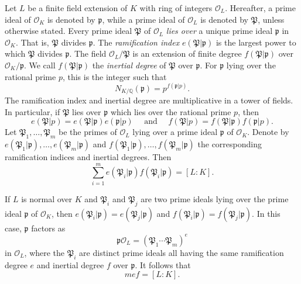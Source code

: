 Let $L$ be a finite field extension of $K$ with ring of integers $\mathcal{O}_L$. Hereafter, a prime ideal of $\mathcal{O}_K$ is denoted by $\mathfrak{p}$, while a prime ideal of $\mathcal{O}_L$ is denoted by $\mathfrak{P}$, unless otherwise stated. Every prime ideal $\mathfrak{P}$ of $\mathcal{O}_L$ \textit{lies over} a unique prime ideal $\mathfrak{p}$ in $\mathcal{O}_K$. That is, $\mathfrak{P}$ divides $\mathfrak{p}$. The \textit{ramification index} $e({\mathfrak{P}}|\mathfrak{p})$ is the largest power to which $\mathfrak{P}$ divides $\mathfrak{p}$. The field $\mathcal{O}_L/\mathfrak{P}$ is an extension of finite degree $f(\mathfrak{P}|\mathfrak{p})$ over $\mathcal{O}_K/\mathfrak{p}$. We call $f(\mathfrak{P}|\mathfrak{p})$ the \textit{inertial degree} of $\mathfrak{P}$ over $\mathfrak{p}$. For $\mathfrak{p}$ lying over the rational prime $p$, this is the integer such that 
\[N_{K/\mathbb{Q}}(\mathfrak{p}) = p^{f(\mathfrak{p}|p)}.\]
The ramification index and inertial degree are multiplicative in a tower of fields. In particular, if $\mathfrak{P}$ lies over $\mathfrak{p}$ which lies over the rational prime $p$, then
\[e({\mathfrak{P}}|p) = e({\mathfrak{P}}|\mathfrak{p})e({\mathfrak{p}}|p) \quad \text{ and } \quad f({\mathfrak{P}}|p) = f({\mathfrak{P}}|\mathfrak{p})f({\mathfrak{p}}|p).\]
Let $\mathfrak{P}_1, \dots, \mathfrak{P}_m$ be the primes of $\mathcal{O}_L$ lying over a prime ideal $\mathfrak{p}$ of $\mathcal{O}_K$. Denote by $e({\mathfrak{P}}_1|\mathfrak{p}),\dots, e({\mathfrak{P}}_m|\mathfrak{p})$ and $f({\mathfrak{P}}_1|\mathfrak{p}), \dots, f({\mathfrak{P}}_m|\mathfrak{p})$ the corresponding ramification indices and inertial degrees. Then
\[\sum_{i=1}^m e({\mathfrak{P}}_i|\mathfrak{p})f({\mathfrak{P}}_i|\mathfrak{p}) = [L:K].\]

If $L$ is normal over $K$ and $\mathfrak{P}_i$ and $\mathfrak{P}_j$ are two prime ideals lying over the prime ideal $\mathfrak{p}$ of $\mathcal{O}_K$, then $e({\mathfrak{P}}_i|\mathfrak{p}) = e({\mathfrak{P}}_j|\mathfrak{p})$ and $f({\mathfrak{P}}_i|\mathfrak{p}) = f({\mathfrak{P}}_j|\mathfrak{p})$. In this case, $\mathfrak{p}$ factors as
\[\mathfrak{p}\mathcal{O}_L = \left( \mathfrak{P}_1 \cdots \mathfrak{P}_m\right)^e\]
in $\mathcal{O}_L$, where the $\mathfrak{P}_i$ are distinct prime ideals all having the same ramification degree $e$ and inertial degree $f$ over $\mathfrak{p}$. It follows that 
\[mef = [L:K].\]


